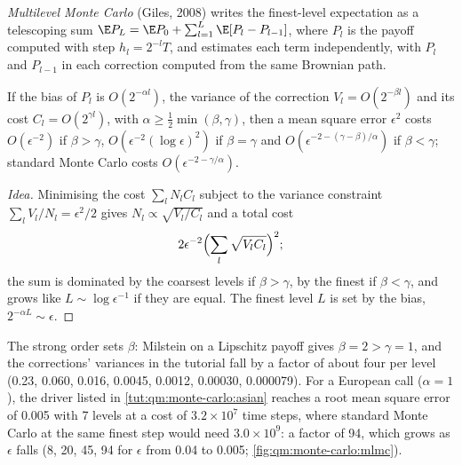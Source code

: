 \begin{definition}\label{def:qm:monte-carlo:mlmc}
\emph{Multilevel Monte Carlo} (Giles, 2008) writes the finest-level expectation as a telescoping sum $\E P_L = \E P_0 + \sum_{l=1}^L\E[P_l - P_{l-1}]$, where $P_l$ is the
payoff computed with step $h_l = 2^{-l}T$, and estimates each term independently, with $P_l$ and $P_{l-1}$ in each correction computed from the same Brownian path.
\end{definition}

\begin{proposition}\label{prop:qm:monte-carlo:giles}
If the bias of $P_l$ is $O(2^{-\alpha l})$, the variance of the correction $V_l = O(2^{-\beta l})$ and its cost $C_l = O(2^{\gamma l})$, with $\alpha \ge \frac12\min(\beta, \gamma)$, then a mean square error
$\epsilon^2$ costs $O(\epsilon^{-2})$ if $\beta > \gamma$, $O(\epsilon^{-2}(\log\epsilon)^2)$ if $\beta = \gamma$ and $O(\epsilon^{-2 - (\gamma - \beta)/\alpha})$ if $\beta < \gamma$; standard Monte Carlo costs
$O(\epsilon^{-2 - \gamma/\alpha})$.
\end{proposition}

\begin{proof}[Idea]
Minimising the cost $\sum_lN_lC_l$ subject to the variance constraint $\sum_lV_l/N_l = \epsilon^2/2$ gives $N_l \propto\sqrt{V_l/C_l}$ and a total cost
\[2\epsilon^{-2}\Bigl(\sum_l\sqrt{V_lC_l}\Bigr)^2;\]
the sum is dominated by the coarsest levels
if $\beta > \gamma$, by the finest if $\beta < \gamma$, and grows like $L \sim \log\epsilon^{-1}$ if they are equal. The finest level $L$ is set by the bias, $2^{-\alpha L} \sim \epsilon$.
\end{proof}

The strong order sets $\beta$: Milstein on a Lipschitz payoff gives $\beta = 2 > \gamma = 1$, and the corrections' variances in the tutorial fall by a factor of about four per level
(0.23, 0.060, 0.016, 0.0045, 0.0012, 0.00030, 0.000079). For a European call ($\alpha = 1$), the driver listed in \cref{tut:qm:monte-carlo:asian} reaches a root mean square error of 0.005 with 7 levels
at a cost of $3.2 \times 10^7$ time steps, where standard Monte Carlo at the same finest step would need $3.0 \times 10^9$: a factor of 94, which grows as $\epsilon$ falls (8, 20, 45, 94 for
$\epsilon$ from 0.04 to 0.005; \cref{fig:qm:monte-carlo:mlmc}).

